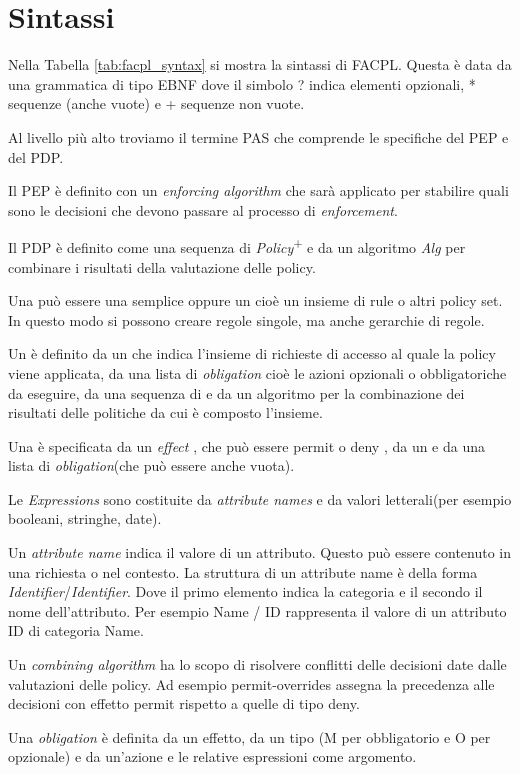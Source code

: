 \section{Sintassi}
\label{sub:Componenti del sistema}
Nella Tabella \ref{tab:facpl_syntax} si mostra la sintassi di \ac{FACPL}. Questa è data da una grammatica di tipo \ac{EBNF} dove il simbolo ? indica
elementi opzionali, * sequenze (anche vuote) e + sequenze non vuote.\par
{\label{Sintassi di FACPL}}
Al livello più alto troviamo il termine  \ac{PAS} che comprende le specifiche del \ac{PEP} e del \ac{PDP}.\par
Il \ac{PEP} è definito con un \emph{enforcing algorithm} che sarà applicato per stabilire quali sono le decisioni che devono
passare al processo di \emph{enforcement}.\par
Il \ac{PDP} è definito come una sequenza di \emph{Policy}\textsuperscript{+} e da un algoritmo \emph{Alg} per combinare i
risultati della valutazione delle policy.\par
Una \ePolicy può essere una \eRule semplice oppure un \ePolicySet cioè un insieme di rule o altri
policy set. In questo modo si possono creare regole singole, ma anche gerarchie di regole.\par
Un \ePolicySet è definito da un \etarget che indica l'insieme di richieste di accesso al quale la policy
viene applicata, da una lista di \emph{obligation} cioè le azioni opzionali o obbligatoriche da eseguire, da una
sequenza di \ePolicy e da un algoritmo per la combinazione dei risultati delle politiche da cui è composto l'insieme.\par
Una \eRule  è specificata da un \emph{effect} , che può essere permit o deny , da un \etarget
e da una lista di \emph{obligation}(che può essere anche vuota). \par
Le \emph{Expressions} sono costituite da \emph{attribute names} e da valori letterali(per esempio booleani, stringhe, date).\par
Un \emph{attribute name} indica il valore di un attributo. Questo può essere contenuto in una richiesta o nel contesto. La
struttura di un attribute name è della forma \emph{Identifier}/\emph{Identifier}. Dove il primo elemento indica la categoria
e il secondo il nome dell'attributo. Per esempio Name / ID rappresenta il valore di un attributo ID di categoria Name.\par
Un \emph{combining algorithm} ha lo scopo di risolvere conflitti delle decisioni date dalle valutazioni delle policy.
Ad esempio permit-overrides assegna la precedenza alle decisioni con effetto permit rispetto a quelle di tipo deny.\par
Una \emph{obligation} è definita da un effetto, da un tipo (M per obbligatorio e O per opzionale) e da un'azione e le relative
espressioni come argomento.\par

